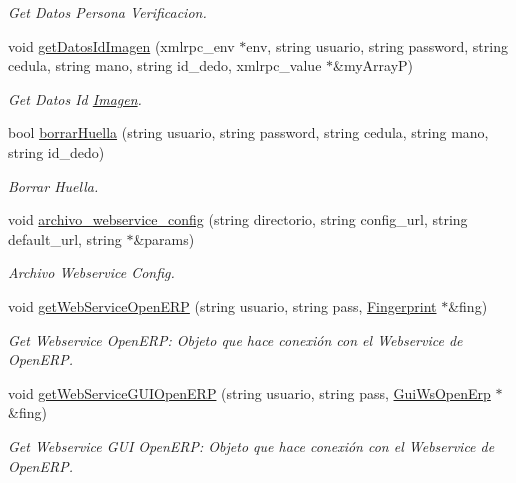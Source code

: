 \begin{DoxyCompactItemize}
\begin{DoxyCompactList}\small\item\em Get Datos Persona Verificacion. \end{DoxyCompactList}\item 
void \hyperlink{classTemplateAFIS__webservice_aea7f1b638633ee2440c38573e74d8984}{get\+Datos\+Id\+Imagen} (xmlrpc\+\_\+env $\ast$env, string usuario, string password, string cedula, string mano, string id\+\_\+dedo, xmlrpc\+\_\+value $\ast$\&my\+ArrayP)
\begin{DoxyCompactList}\small\item\em Get Datos Id \hyperlink{classImagen}{Imagen}. \end{DoxyCompactList}\item 
bool \hyperlink{classTemplateAFIS__webservice_ac3575e5ecd80a7847c2ecda152778e38}{borrar\+Huella} (string usuario, string password, string cedula, string mano, string id\+\_\+dedo)
\begin{DoxyCompactList}\small\item\em Borrar Huella. \end{DoxyCompactList}\item 
void \hyperlink{classTemplateAFIS__webservice_ab867c16199162845402d90191f769b74}{archivo\+\_\+webservice\+\_\+config} (string directorio, string config\+\_\+url, string default\+\_\+url, string $\ast$\&params)
\begin{DoxyCompactList}\small\item\em Archivo Webservice Config. \end{DoxyCompactList}\item 
void \hyperlink{classTemplateAFIS__webservice_a9c035f2b4dc64d540ae6e4e9161e0fa3}{get\+Web\+Service\+Open\+E\+RP} (string usuario, string pass, \hyperlink{classFingerprint}{Fingerprint} $\ast$\&fing)
\begin{DoxyCompactList}\small\item\em Get Webservice Open\+E\+RP\+: Objeto que hace conexión con el Webservice de Open\+E\+RP. \end{DoxyCompactList}\item 
void \hyperlink{classTemplateAFIS__webservice_acd9566662ac9e462b438e21c788d5f48}{get\+Web\+Service\+G\+U\+I\+Open\+E\+RP} (string usuario, string pass, \hyperlink{classGuiWsOpenErp}{Gui\+Ws\+Open\+Erp} $\ast$\&fing)
\begin{DoxyCompactList}\small\item\em Get Webservice G\+UI Open\+E\+RP\+: Objeto que hace conexión con el Webservice de Open\+E\+RP. \end{DoxyCompactList}\item 

\end{DoxyCompactItemize}
